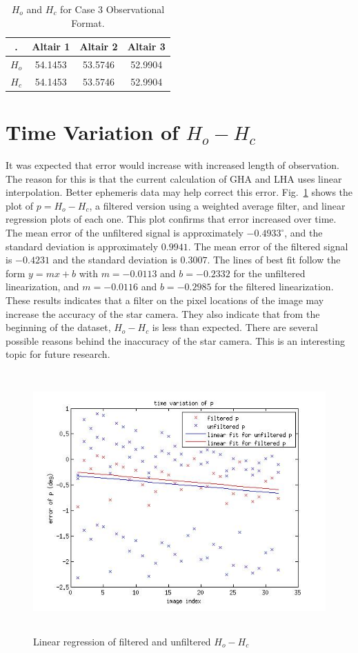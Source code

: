 \documentclass[12pt,a4paper]{book}
\begin{document}
\begin{table}[ht!]
\centering
\begin{tabular}{ |c|c|c|c| } 
 \hline
 . & Altair 1 & Altair 2 & Altair 3 \\ 
 \hline
 $H_{o}$ & 54.1453 & 53.5746 & 52.9904 \\ 
 \hline
 $H_{c}$ & 54.1453 & 53.5746  & 52.9904 \\ 
 \hline
\end{tabular}
\caption{$H_{o}$ and $H_{c}$ for Case 3 Observational Format.}
\label{t:z1s3t}
\end{table}
\FloatBarrier

\section{Time Variation of $H_{o} - H_{c}$}
It was expected that error would increase with increased length of observation.  The reason for this is that the current calculation of GHA and LHA uses linear interpolation.  Better ephemeris data may help correct this error. Fig.~\ref{f:timeVariation} shows the plot of $p = H_{o} - H_{c}$, a filtered version using a weighted average filter, and linear regression plots of each one.  This plot confirms that error increased over time.  The mean error of the unfiltered signal is approximately $-0.4933^{\circ}$, and the standard deviation is approximately $0.9941$.  The mean error of the filtered signal is $-0.4231$ and the standard deviation is $0.3007$.  The lines of best fit follow the form $y=mx+b$ with $m = -0.0113$ and $b = -0.2332$ for the unfiltered linearization, and $m = -0.0116$ and $b = -0.2985$ for the filtered linearization.  These results indicates that a filter on the pixel locations of the image may increase the accuracy of the star camera.  They also indicate that from the beginning of the dataset, $H_{o} - H_{c}$ is less than expected.  There are several possible reasons behind the inaccuracy of the star camera.  This is an interesting topic for future research. 
\begin{figure}[!ht]
\centering
\includegraphics[height=10cm]{timeVariation.jpg}
\caption{Linear regression of filtered and unfiltered $H_{o} - H_{c}$}
\label{f:timeVariation}
\end{figure}
\FloatBarrier
\end{document}
